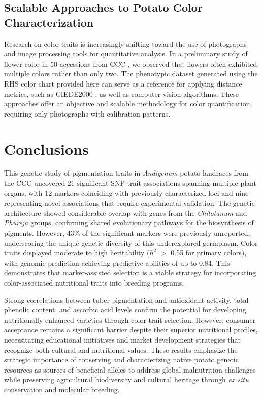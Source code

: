 \documentclass[pdflatex,sn-mathphys-ay]{sn-jnl}%
\begin{document}
\subsection{Scalable Approaches to Potato Color Characterization}


Research on color traits is increasingly shifting toward the use of photographs and image processing tools for quantitative analysis. In a preliminary study of flower color in 50 accessions from CCC \citep{Lopez2024}, we observed that flowers often exhibited multiple colors rather than only two. The phenotypic dataset generated using the RHS color chart provided here can serve as a reference for applying distance metrics, such as CIEDE2000 \citep{tao2020smartphone}, as well as computer vision algorithms. These approaches offer an objective and scalable methodology for color quantification, requiring only photographs with calibration patterns.


\section{Conclusions}

This genetic study of pigmentation traits in \textit{Andigenum} potato landraces from the CCC uncovered 21 significant SNP-trait associations spanning multiple plant organs, with 12 markers coinciding with previously characterized loci and nine representing novel associations that require experimental validation. The genetic architecture showed considerable overlap with genes from the \textit{Chilotanum} and \textit{Phureja} groups, confirming shared evolutionary pathways for the biosynthesis of pigments. However, 43\% of the significant markers were previously unreported, underscoring the unique genetic diversity of this underexplored germplasm. Color traits displayed moderate to high heritability ($h^2$ $>$ 0.55 for primary colors), with genomic prediction achieving predictive abilities of up to 0.84. This demonstrates that marker-assisted selection is a viable strategy for incorporating color-associated nutritional traits into breeding programs.


Strong correlations between tuber pigmentation and antioxidant activity, total phenolic content, and ascorbic acid levels confirm the potential for developing nutritionally enhanced varieties through color trait selection. However, consumer acceptance remains a significant barrier despite their superior nutritional profiles, necessitating educational initiatives and market development strategies that recognize both cultural and nutritional values. These results emphasize the strategic importance of conserving and characterizing native potato genetic resources as sources of beneficial alleles to address global malnutrition challenges while preserving agricultural biodiversity and cultural heritage through \textit{ex situ} conservation and molecular breeding.
\end{document}
